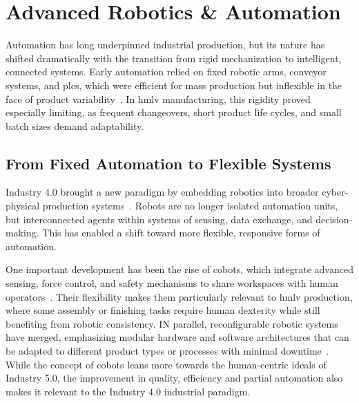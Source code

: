 \section{Advanced Robotics \& Automation}\label{sec:automation}

Automation has long underpinned industrial production, but its nature has shifted dramatically with the transition from rigid mechanization to intelligent, connected systems.
Early automation relied on fixed robotic arms, conveyor systems, and \ac{plc}s, which were efficient for mass production but inflexible in the face of product variability~\cite{brettel-how-virtualization-decentralization-and-networking, monsori-cpps-roots-expectations-rnd-challenges}.
In \ac{hmlv} manufacturing, this rigidity proved especially limiting, as frequent changeovers, short product life cycles, and small batch sizes demand adaptability.

\subsection{From Fixed Automation to Flexible Systems}

Industry 4.0 brought a new paradigm by embedding robotics into broader cyber-physical production systems~\cite{monsori-cps-in-manufacturing}.
Robots are no longer isolated automation units, but interconnected agents within systems of sensing, data exchange, and decision-making.
This has enabled a shift toward more flexible, responsive forms of automation.

One important development has been the rise of \ac{cobots}, which integrate advanced sensing, force control, and safety mechanisms to share workspaces with human operators~\cite{villani-survey-on-human-robot-collaboration-in-industrial-settings}.
Their flexibility makes them particularly relevant to \ac{hmlv} production, where some assembly or finishing tasks require human dexterity while still benefiting from robotic consistency.
IN parallel, reconfigurable robotic systems have merged, emphasizing modular hardware and software architectures that can be adapted to different product types or processes with minimal downtime~\cite{Bi-reconfigurable-manufacturing-systems-state-of-the-art,bortolini-reconfigurable-manufacturing-systems-literature-review}.
While the concept of \ac{cobots} leans more towards the human-centric ideals of Industry 5.0, the improvement in quality, efficiency and partial automation also makes it relevant to the Industry 4.0 industrial paradigm.

